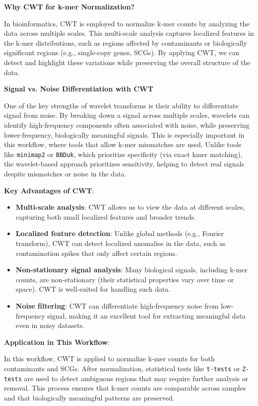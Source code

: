 \documentclass[11pt]{report}
\begin{document}
{\begin{tcolorbox}[label=box:Wavelets, colback=gray!10!white, coltitle=white, colframe=gray!80!black, title= Wavelets, breakable]
	\textbf{Why CWT for k-mer Normalization?}
	
	In bioinformatics, CWT is employed to normalize k-mer counts by analyzing the data across multiple scales. This multi-scale analysis captures localized features in the k-mer distributions, such as regions affected by contaminants or biologically significant regions (e.g., single-copy genes, SCGs). By applying CWT, we can detect and highlight these variations while preserving the overall structure of the data.
	
	\textbf{Signal vs. Noise Differentiation with CWT}
	
	One of the key strengths of wavelet transforms is their ability to differentiate signal from noise. By breaking down a signal across multiple scales, wavelets can identify high-frequency components often associated with noise, while preserving lower-frequency, biologically meaningful signals. This is especially important in this workflow, where tools that allow k-mer mismatches are used. Unlike tools like \texttt{minimap2} or \texttt{BBDuk}, which prioritize specificity (via exact kmer matching), the wavelet-based approach prioritizes sensitivity, helping to detect real signals despite mismatches or noise in the data.
	
	\textbf{Key Advantages of CWT}:
	\begin{itemize}
		\item \textbf{Multi-scale analysis}: CWT allows us to view the data at different scales, capturing both small localized features and broader trends.
		\item \textbf{Localized feature detection}: Unlike global methods (e.g., Fourier transform), CWT can detect localized anomalies in the data, such as contamination spikes that only affect certain regions.
		\item \textbf{Non-stationary signal analysis}: Many biological signals, including k-mer counts, are non-stationary (their statistical properties vary over time or space). CWT is well-suited for handling such data.
		\item \textbf{Noise filtering}: CWT can differentiate high-frequency noise from low-frequency signal, making it an excellent tool for extracting meaningful data even in noisy datasets.
	\end{itemize}
	
	\textbf{Application in This Workflow}:
	
	In this workflow, CWT is applied to normalize k-mer counts for both contaminants and SCGs. After normalization, statistical tests like \texttt{t-tests} or \texttt{Z-tests} are used to detect ambiguous regions that may require further analysis or removal. This process ensures that k-mer counts are comparable across samples and that biologically meaningful patterns are preserved.
	

\end{tcolorbox}}
\end{document}
